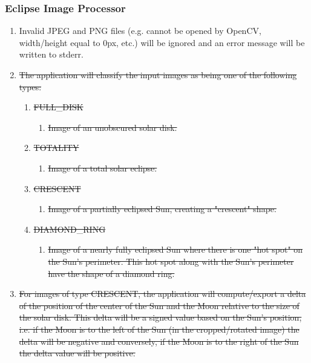 \documentclass[10pt, onecolumn, draftclsnofoot, letterpaper, compsoc]{IEEEtran}
\begin{document}
\subsubsection{Eclipse Image Processor}
	\begin{enumerate}
		\item Invalid JPEG and PNG files (e.g. cannot be opened by OpenCV,
		width/height equal to 0px, etc.) will be ignored and an error message
		will be written to stderr.

		\item \sout{The application will classify the input images as being one of
			the following types:}
		\begin{enumerate}
			\item \sout{FULL\_DISK}
			\begin{enumerate}
				\item \sout{Image of an unobscured solar disk.}
			\end{enumerate}

			\item \sout{TOTALITY}
			\begin{enumerate}
				\item \sout{Image of a total solar eclipse.}
			\end{enumerate}

			\item \sout{CRESCENT}
			\begin{enumerate}
				\item \sout{Image of a partially eclipsed Sun, creating a "crescent"
					shape.}
			\end{enumerate}

			\item \sout{DIAMOND\_RING}
			\begin{enumerate}
				\item \sout{Image of a nearly fully eclipsed Sun where there is one
					"hot spot" on the Sun's perimeter. This hot spot along with the
					Sun's perimeter have the shape of a diamond ring.}
			\end{enumerate}
		\end{enumerate}

		\item \sout{For images of type CRESCENT, the application will compute/export
		a delta of the position of the center of the Sun and the
		Moon relative to the size of the solar disk. This delta will be a
		signed value based on the Sun's position, i.e. if the Moon is to
		the left of the Sun (in the cropped/rotated image) the delta will
		be negative and conversely, if the Moon is to the right of the Sun
		the delta value will be positive.}


\end{enumerate}
\end{document}
